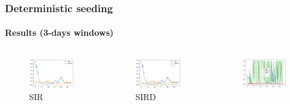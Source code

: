 \documentclass[aspectratio=43]{beamer}
\begin{document}
\begin{frame}
	\frametitle{Deterministic seeding}
	\framesubtitle{Results (3-days windows)}
	\begin{columns}
		\begin{figure}
			\includegraphics[width=\textwidth]{img/sir_det_3.png}
			\caption{SIR}
		\end{figure}
		\begin{figure}
			\includegraphics[width=\textwidth]{img/sird_det_3.png}
			\caption{SIRD}
		\end{figure}
		\begin{figure}
			\includegraphics[width=\textwidth]{img/seird_det_1_3.png}

\end{figure}
\end{columns}
\end{frame}
\end{document}
